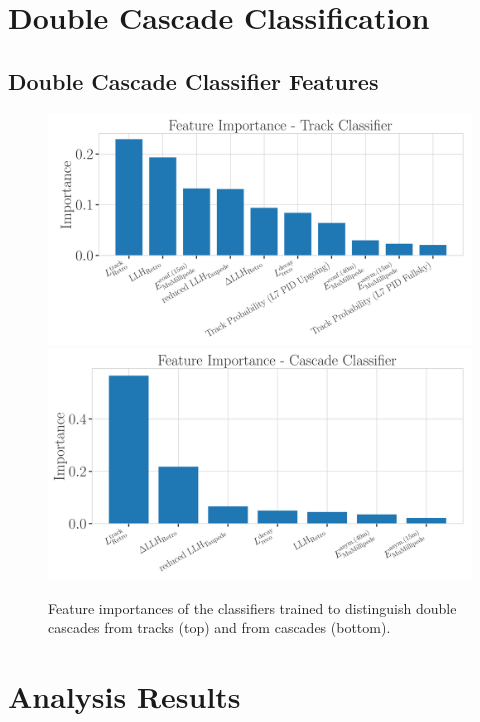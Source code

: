 \chapter{Double Cascade Classification}

\section{Double Cascade Classifier Features} 

\begin{figure}[h]
    \includegraphics[width=0.8\linewidth]{figures/results/190607/classification/track_feature_importance.png}
    \includegraphics[width=0.8\linewidth]{figures/results/190607/classification/cascade_feature_importance.png}
    \caption[Double cascade classifiers feature importances]{Feature importances of the  classifiers trained to distinguish double cascades from tracks (top) and from cascades (bottom).}
\end{figure}

\chapter{Analysis Results}

